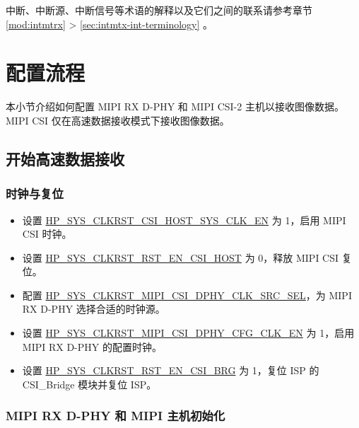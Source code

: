 \documentclass[main\_\_CN.tex]{subfiles}
\begin{document}
\begin{tiplisting}
中断、中断源、中断信号等术语的解释以及它们之间的联系请参考章节 \ref{mod:intmtrx} \textit{} > \ref{sec:intmtx-int-terminology} \textit{}。
\end{tiplisting}



\section{配置流程}
\label{sec:mipicsi-prog-procedures}

本小节介绍如何配置 MIPI RX D-PHY 和 MIPI CSI-2 主机以接收图像数据。MIPI CSI 仅在高速数据接收模式下接收图像数据。

\subsection{开始高速数据接收}

\subsubsection{时钟与复位}
\begin{itemize}
    \item 设置 \hyperref[fielddesc:HPSYSCLKRSTCSIHOSTSYSCLKEN]{HP\_SYS\_CLKRST\_CSI\_HOST\_SYS\_CLK\_EN} 为 1，启用 MIPI CSI 时钟。
    \item 设置 \hyperref[fielddesc:HPSYSCLKRSTRSTENCSIHOST]{HP\_SYS\_CLKRST\_RST\_EN\_CSI\_HOST} 为 0，释放 MIPI CSI 复位。
    \item 配置 \hyperref[fielddesc:HPSYSCLKRSTMIPICSIDPHYCLKSRCSEL]{HP\_SYS\_CLKRST\_MIPI\_CSI\_DPHY\_CLK\_SRC\_SEL}，为 MIPI RX D-PHY 选择合适的时钟源。
    \item 设置 \hyperref[fielddesc:HPSYSCLKRSTMIPICSIDPHYCFGCLKEN]{HP\_SYS\_CLKRST\_MIPI\_CSI\_DPHY\_CFG\_CLK\_EN} 为 1，启用 MIPI RX D-PHY 的配置时钟。
    \item 设置 \hyperref[fielddesc:HPSYSCLKRSTRSTENCSIBRG]{HP\_SYS\_CLKRST\_RST\_EN\_CSI\_BRG} 为 1，复位 ISP 的 CSI\_Bridge 模块并复位 ISP。
\end{itemize}

\subsubsection{MIPI RX D-PHY 和 MIPI 主机初始化}
\end{document}
